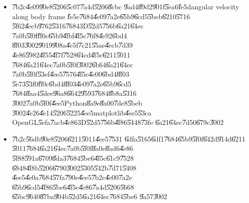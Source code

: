 \documentclass[12pt,a4paper]{article}
\begin{document}
\begin{itemize}
\U{4f8b}\U{64cd}\U{4f5c}\U{9019}\U{975e}\U{5e38}\U{91cd}\U{8981}\U{7684}%
\U{4e00}\U{74b0}\U{ff0c}\U{9019}\U{88e1}\U{5247}\U{63d0}\U{4f9b}\U{5b8c}%
\U{6574}\U{7684}\U{5be6}\U{4f8b}\U{9a57}\U{8b49}\U{3002}\newline
\newline
\U{7b2c}\U{4e8c}\U{90e8}\U{5206}\U{6700}\U{5f8c}\U{4e5f}\U{8aaa}\U{660e}%
\U{4e86}\U{4ee5}\U{8cbc}\U{9ad4}\U{8f49}\U{52d5}\U{5411}\U{91cf}\U{4f86}%
\U{8fd1}\U{4f3c}t\U{5230}t+dt\U{6642}\U{9593}\U{7684}\U{5fae}\U{5c0f}\U{8f49}%
\U{52d5}\U{6642}\U{6211}\U{5011}\U{5c07}\U{4ee5}\U{5728}t+dt\U{6642}\U{9593}%
\U{7684}\U{8cbc}\U{9ad4}\U{89d2}\U{901f}\U{5ea6}\U{4f86}\U{8fd1}\U{4f3c}%
\U{ff0c}\U{5373}\U{4ee5}$\vec{\omega}_{b}\left( t+dt\right) $\U{4f86}\U{5efa}%
\U{7acb}dt\U{6642}\U{9593}\U{5167}\U{7684}\U{8f49}\U{52d5}\U{77e9}\U{9663}$%
\footnote{%
The path order exponential of $\vec{\omega}_{b}$ from time t to t+dt. This
will be discussed more in the text.}$\U{3002}\U{9019}\U{88e1}\U{4e5f}\U{6bd4}%
\U{8f03}\U{4e00}\U{822c}\U{5e38}\U{898b}\U{7684}$\vec{\omega}_{b}\left(
t\right) $\U{65b9}\U{6cd5}\U{7684}\U{7d50}\U{679c}\U{4f86}\U{8b49}\U{660e}%
\U{6b64}\U{512a}\U{5316}\U{6240}\U{5e36}\U{4f86}\U{7cbe}\U{5ea6}\U{4e0a}%
\U{7684}\U{63d0}\U{5347}\U{3002}

\item \U{7b2c}\U{4e09}\U{90e8}\U{5206}\U{5c07}\U{7a4d}\U{5206}\U{8cbc}%
\U{9ad4}\U{89d2}\U{901f}\U{5ea6}\U{fe5d}angular velocity along body frame%
\U{fe5e}\U{7684}\U{4e09}\U{7a2e}\U{65b9}\U{6cd5}\U{5beb}\U{6210}\U{5716}%
\U{5f62}\U{4ecb}\U{9762}\U{5316}\U{7684}3D\U{52d5}\U{756b}\U{6a21}\U{64ec}%
\U{7a0b}\U{5f0f}\U{ff0c}\U{65b9}\U{4fbf}\U{4f5c}\U{76f8}\U{4e92}\U{6bd4}%
\U{8f03}\U{3002}\U{9019}\U{908a}\U{4e5f}\U{7c21}\U{55ae}\U{4ecb}\U{7d39}%
\U{4e86}\U{5982}\U{4f55}\U{4f7f}\U{7528}\U{64cd}\U{4f5c}\U{6211}\U{5011}%
\U{7684}\U{6a21}\U{64ec}\U{7a0b}\U{5f0f}\U{3002}\U{6b64}\U{6a21}\U{64ec}%
\U{7a0b}\U{5f0f}\U{53ef}\U{4ee5}\U{7576}\U{4f5c}\U{4e00}\U{6bd4}\U{8f03}%
\U{5e73}\U{53f0}\U{ff0c}\U{6bd4}\U{8f03}\U{4e09}\U{7a2e}\U{65b9}\U{6cd5}%
\U{7684}\U{8aa4}\U{5dee}\U{96a8}\U{6642}\U{9593}\U{7684}\U{8b8a}\U{5316}%
\U{3002}\U{7a0b}\U{5f0f}\U{4ee5}Python\U{8a9e}\U{8a00}\U{7de8}\U{5beb}%
\U{3002}\U{4e26}\U{4e14}\U{5206}\U{5225}\U{4ee5}matplotlib\U{4ee5}\U{53ca}%
OpenGL\U{5efa}\U{7acb}\U{4e86}3D\U{52d5}\U{756b}\U{4f86}\U{5448}\U{73fe}%
\U{6a21}\U{64ec}\U{7d50}\U{679c}\U{3002}

\item \U{7b2c}\U{56db}\U{90e8}\U{5206}\U{6211}\U{5011}\U{4ee5}\U{7531}%
\U{6dfa}\U{5165}\U{6df1}\U{7684}\U{65b9}\U{5f0f}\U{642d}\U{914d}\U{6211}%
\U{5011}\U{7684}\U{6a21}\U{64ec}\U{7a0b}\U{5f0f}\U{8a0e}\U{8ad6}\U{4e86}%
\U{5f88}\U{591a}\U{6709}\U{8da3}\U{7684}\U{5be6}\U{4f5c}\U{61c9}\U{7528}%
\U{6848}\U{4f8b}\U{5206}\U{6790}\U{3002}\U{5305}\U{542b}\U{7d71}\U{5408}%
\U{4ee5}\U{4e0a}\U{7684}\U{57fa}\U{790e}\U{4ee5}\U{7b2c}\U{4e00}\U{7a2e}%
\U{65b9}\U{6cd5}\U{4f86}\U{5be6}\U{4f5c}\U{4e86}\U{7a4d}\U{5206}\U{5668}%
\U{65bc}\U{9640}\U{87ba}\U{904b}\U{52d5}\U{6a21}\U{64ec}\U{7684}\U{5be6}%
\U{9a57}\U{3002}


\end{itemize}
\end{document}
